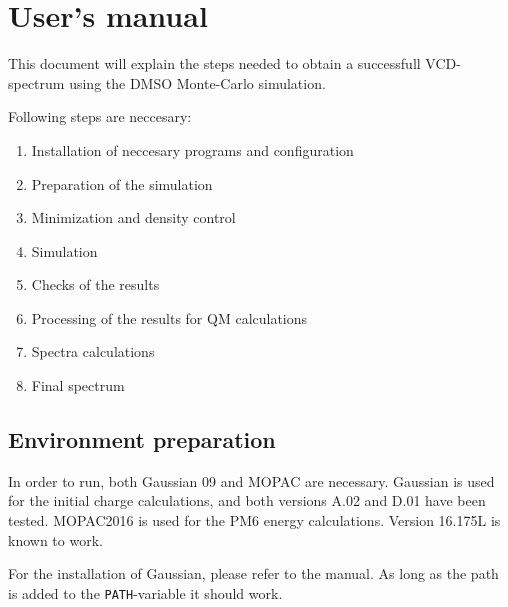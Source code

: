 \documentclass[a4paper,fleqn]{report}
\begin{document}
	
	\chapter{User's manual}

	
	This document will explain the steps needed to obtain a successfull VCD-spectrum using the DMSO Monte-Carlo simulation.
	
	Following steps are neccesary:
	\begin{enumerate}
		\setlength{\itemsep}{-1pt}
		\setlength{\parsep}{-1pt}
		\item Installation of neccesary programs and configuration
		\item Preparation of the simulation
		\item Minimization and density control
		\item Simulation
		\item Checks of the results
		\item Processing of the results for QM calculations
		\item Spectra calculations
		\item Final spectrum
	\end{enumerate}
	
	\section{Environment preparation}
	In order to run, both Gaussian 09 and MOPAC are necessary. Gaussian is used for the initial charge calculations, and both versions A.02 and D.01 have been tested.
	MOPAC2016 is used for the PM6 energy calculations. Version 16.175L is known to work.
	
	For the installation of Gaussian, please refer to the manual. As long as the path is added to the \verb|PATH|-variable it should work.
	
	
	
\end{document}
